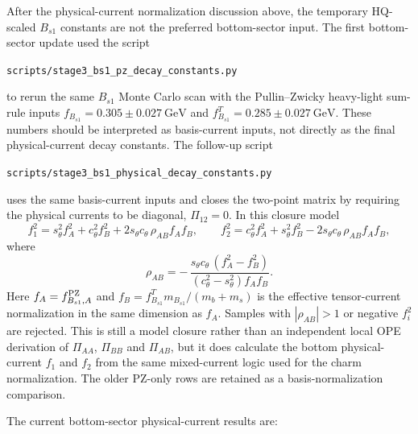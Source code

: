 \documentclass[11pt]{article}
\newcommand{\GeV}{\mathrm{GeV}}
\begin{document}
After the physical-current normalization discussion above, the temporary
HQ-scaled $B_{s1}$ constants are not the preferred bottom-sector input.  The
first bottom-sector update used the script
\begin{center}
  \texttt{scripts/stage3\_bs1\_pz\_decay\_constants.py}
\end{center}
to rerun the same $B_{s1}$ Monte Carlo scan with the Pullin--Zwicky
heavy-light sum-rule inputs
$f_{B_{s1}}=0.305\pm0.027~\GeV$ and
$f^T_{B_{s1}}=0.285\pm0.027~\GeV$.  These numbers should be interpreted as
basis-current inputs, not directly as the final physical-current decay
constants.  The follow-up script
\begin{center}
  \texttt{scripts/stage3\_bs1\_physical\_decay\_constants.py}
\end{center}
uses the same basis-current inputs and closes the two-point matrix by requiring
the physical currents to be diagonal, $\Pi_{12}=0$.  In this closure model
\[
  f_1^2=s_\theta^2 f_A^2+c_\theta^2 f_B^2
       +2s_\theta c_\theta\,\rho_{AB} f_A f_B,\qquad
  f_2^2=c_\theta^2 f_A^2+s_\theta^2 f_B^2
       -2s_\theta c_\theta\,\rho_{AB} f_A f_B,
\]
where
\[
  \rho_{AB}=
  -\,\frac{s_\theta c_\theta\,(f_A^2-f_B^2)}
  {(c_\theta^2-s_\theta^2)f_Af_B}.
\]
Here $f_A=f_{B_{s1},A}^{\rm PZ}$ and
$f_B=f^T_{B_{s1}}m_{B_{s1}}/(m_b+m_s)$ is the effective tensor-current
normalization in the same dimension as $f_A$.  Samples with $|\rho_{AB}|>1$ or
negative $f_i^2$ are rejected.  This is still a model closure rather than an
independent local OPE derivation of $\Pi_{AA}$, $\Pi_{BB}$ and $\Pi_{AB}$, but it
does calculate the bottom physical-current $f_1$ and $f_2$ from the same
mixed-current logic used for the charm normalization.  The older PZ-only rows
are retained as a basis-normalization comparison.

The current bottom-sector physical-current results are:
\end{document}
